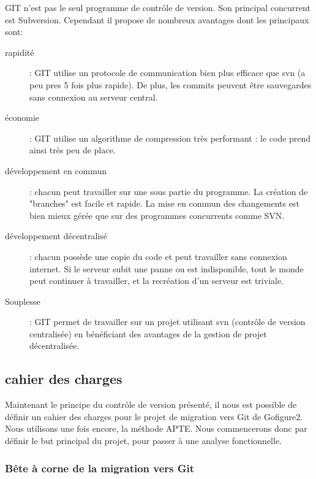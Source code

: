 GIT n'est pas le seul programme de contrôle de version. Son principal concurrent est Subversion.
Cependant il propose de nombreux avantages dont les principaux sont:
\begin{description}
  \item[rapidité] : GIT utilise un protocole de communication bien plus efficace que svn (a peu pres 5 fois plus rapide). 
  De plus, les commits peuvent être sauvegardes sans connexion au serveur central.
  \item[économie] : GIT utilise un algorithme de compression très performant : le code prend ainsi très peu de place.
  \item[développement en commun] : chacun peut travailler sur une sous partie du programme. La création de "branches" est facile et
  rapide. La mise en commun des changements est bien mieux gérée que sur des programmes concurrents comme SVN.
  \item[développement décentralisé] : chacun possède une copie du code et peut travailler sans connexion internet. 
  Si le serveur subit une panne ou est indisponible, tout le monde peut continuer à travailler, et la recréation d'un serveur est triviale.
  \item[Souplesse] : GIT permet de travailler sur un projet utilisant svn (contrôle de version centralisée)
  en bénéficiant des avantages de la gestion de projet décentralisée.
\end{description}

\subsection{cahier des charges}

Maintenant le principe du contrôle de version présenté,
il nous est possible de définir un cahier des charges pour le projet de migration vers Git de Gofigure2.
Nous utilisons une fois encore, la méthode {APTE\textregistered}.
Nous commencerons donc par définir le but principal du projet, pour passer à une analyse fonctionnelle.

\subsubsection*{Bête à corne de la migration vers Git}

